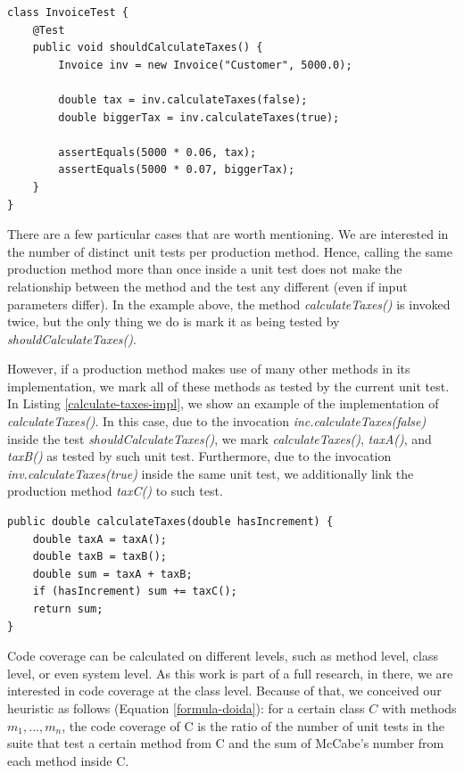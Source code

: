 \documentclass{sig-alternate}
\begin{document}
\begin{lstlisting}
class InvoiceTest {
	@Test
	public void shouldCalculateTaxes() {
		Invoice inv = new Invoice("Customer", 5000.0);

		double tax = inv.calculateTaxes(false);
		double biggerTax = inv.calculateTaxes(true);
		
		assertEquals(5000 * 0.06, tax);
		assertEquals(5000 * 0.07, biggerTax);
	}
}
\end{lstlisting}

There are a few particular cases that are worth mentioning. We are interested in the number 
of distinct unit tests per production method. Hence, calling the same production method
more than once inside a unit test does not make the relationship between the method 
and the test any different (even if input parameters differ). In the example above, the 
method \textit{calculateTaxes()} is invoked twice, but the only thing we do is mark it 
as being tested by \textit{shouldCalculateTaxes()}.

However, if a production method makes use of many other methods in its implementation,
we mark all of these methods as tested by the current unit test. In Listing \ref{calculate-taxes-impl},
we show an example of the implementation of \textit{calculateTaxes()}. In this case, due to the 
invocation \textit{inc.calculateTaxes(false)} inside the test \textit{shouldCalculateTaxes()}, 
we mark \textit{calculateTaxes()}, \textit{taxA()}, and \textit{taxB()} as tested 
by such unit test. Furthermore, due to the invocation \textit{inv.calculateTaxes(true)} inside
the same unit test, we additionally link the production method \textit{taxC()} to such test.

\begin{lstlisting}
public double calculateTaxes(double hasIncrement) {
	double taxA = taxA();
	double taxB = taxB();
	double sum = taxA + taxB;
	if (hasIncrement) sum += taxC();
	return sum;
}
\end{lstlisting}

Code coverage can be calculated on different levels, such as method level, class level, or even
system level. As this work is part of a full research, in there, we are interested in code coverage at the class level.
Because of that, we conceived our heuristic as follows (Equation \ref{formula-doida}): 
for a certain class $C$ with methods $m_1, ..., m_n$, 
the code coverage of C is the ratio of the number of unit tests in the suite that test a certain method from C and 
the sum of McCabe's number from each method inside C.
\end{document}
